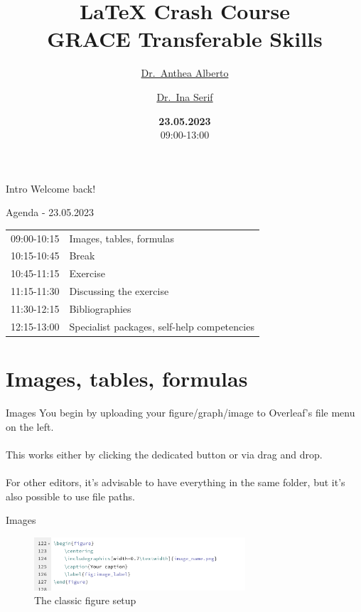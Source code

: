 \documentclass{beamer}
\title[LaTeX crash course]{\LaTeX \hspace{0.2mm} Crash Course \\
GRACE Transferable Skills
} %
\author{\href{mailto:antheajeanne.alberto@unibas.ch}{Dr.\ Anthea Alberto} \and \href{mailto:ina.serif@unibas.ch}{Dr.\ Ina Serif}}
\date{\centering \textbf{23.05.2023}\\
09:00-13:00}
\begin{document}
\begin{frame}
\titlepage %
\end{frame}


\begin{frame}{Intro}
\LARGE \centering Welcome back! 
\end{frame}

\begin{frame}{Agenda - 23.05.2023}
\begin{tabular}{ll}
09:00-10:15 & Images, tables, formulas\\
10:15-10:45 & Break\\
10:45-11:15 & Exercise\\
11:15-11:30 & Discussing the exercise\\
11:30-12:15 & Bibliographies\\
12:15-13:00 & Specialist packages, self-help competencies
\end{tabular} 
\end{frame}

\section{Images, tables, formulas}

\begin{frame}{Images}
You begin by uploading your figure/graph/image to Overleaf's file menu on the left.\\~\\
This works either by clicking the dedicated button or via drag and drop.\\~\\
For other editors, it's advisable to have everything in the same folder, but it's also possible to use file paths.
\end{frame}

\begin{frame}{Images}
\begin{figure}
    \centering
    \includegraphics[width=0.7\textwidth]{figure_setup.png}
    \caption{The classic figure setup}
    \label{fig:fig_inception}
\end{figure}    
\end{frame}
\end{document}
